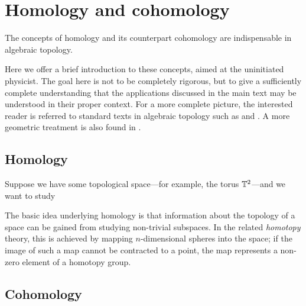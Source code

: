 \chapter{Homology and cohomology}

The concepts of homology and its counterpart cohomology are indispensable in algebraic topology. \red{[\ldots]}  %

Here we offer a brief introduction to these concepts, aimed at the uninitiated physicist. The goal here is not to be completely rigorous, but to give a sufficiently complete understanding that the applications discussed in the main text may be understood in their proper context. For a more complete picture, the interested reader is referred to standard texts in algebraic topology such as \cite{Hatcher_algebraic-topology} and \cite{Bredon_topo-geometry}. A more geometric treatment is also found in \cite{Bott-Tu_differential-forms}.


\section{Homology}

Suppose we have some topological space---for example, the torus $\mathbb{T}^2$---and we want to study \red{[\ldots]}%

The basic idea underlying homology is that information about the topology of a space can be gained from studying non-trivial subspaces. In the related \emph{homotopy} theory, this is achieved by mapping $n$-dimensional spheres into the space; if the image of such a map cannot be contracted to a point, the map represents a non-zero element of a homotopy group.


\section{Cohomology}